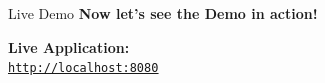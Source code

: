 \begin{frame}{Live Demo}
\centering
\vspace{1cm}
\Large \textbf{Now let's see the Demo in action!}

\vspace{0.8cm}
\normalsize
\textbf{Live Application:} \\
\vspace{0.3cm}
\href{http://localhost:8080}{\underline{\texttt{http://localhost:8080}}}

\end{frame}
